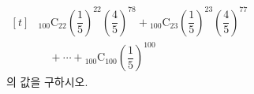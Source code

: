 $\begin{aligned}[t] &{}_{100}\mathrm{C}_{22}\left(\dfrac{1}{5}\right)^{22}\left(\dfrac{4}{5}\right)^{78}+{}_{100}\mathrm{C}_{23}\left(\dfrac{1}{5}\right)^{23}\left(\dfrac{4}{5}\right)^{77}\\ &\quad{}+\cdots+{}_{100}\mathrm{C}_{100}\left(\dfrac{1}{5}\right)^{100}\end{aligned}$\\ 의 값을 구하시오. 
